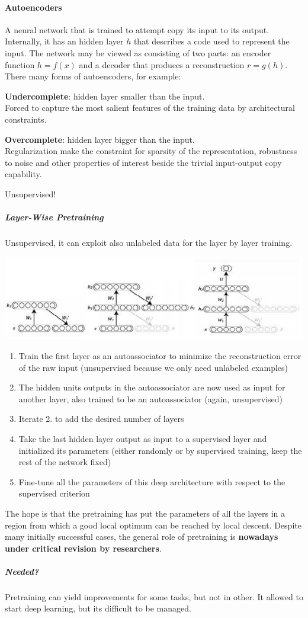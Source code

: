 \documentclass[10pt]{report}
\begin{document}
\paragraph{Autoencoders} A neural network that is trained to attempt copy its input to its output. Internally, it has an hidden layer $h$ that describes a code used to represent the input. The network may be viewed as consisting of two parts: an encoder function $h = f(x)$ and a decoder that produces a reconstruction $r = g(h)$.\\
There many forms of autoencoders, for example:
\begin{list}{}{}
	\item \textbf{Undercomplete}: hidden layer smaller than the input.\\
	Forced to capture the most salient features of the training data by architectural constraints.
	\item \textbf{Overcomplete}: hidden layer bigger than the input.\\
	Regularization make the constraint for sparsity of the representation, robustness to noise and other properties of interest beside the trivial input-output copy capability.
\end{list}
Unsupervised!
\subparagraph{Layer-Wise Pretraining} Unsupervised, it can exploit also unlabeled data for the layer by layer training.
\begin{center}
	\includegraphics[scale=0.5]{30.png}
\end{center}
\begin{enumerate}
	\item Train the first layer as an autoassociator to minimize the reconstruction error of the raw input (unsupervised because we only need unlabeled examples)
	\item The hidden units outputs in the autoassociator are now used as input for another layer, also trained to be an autoassociator (again, unsupervised)
	\item Iterate 2. to add the desired number of layers
	\item Take the last hidden layer output as input to a supervised layer and initialized its parameters (either randomly or by supervised training, keep the rest of the network fixed)
	\item Fine-tune all the parameters of this deep architecture with respect to the supervised criterion
\end{enumerate}
The hope is that the pretraining has put the parameters of all the layers in a region from which a good local optimum can be reached by local descent. Despite many initially successful cases, the general role of pretraining is \textbf{nowadays under critical revision by researchers}.
\subparagraph{Needed?} Pretraining can yield improvements for some tasks, but not in other. It allowed to start deep learning, but its difficult to be managed.
\end{document}
